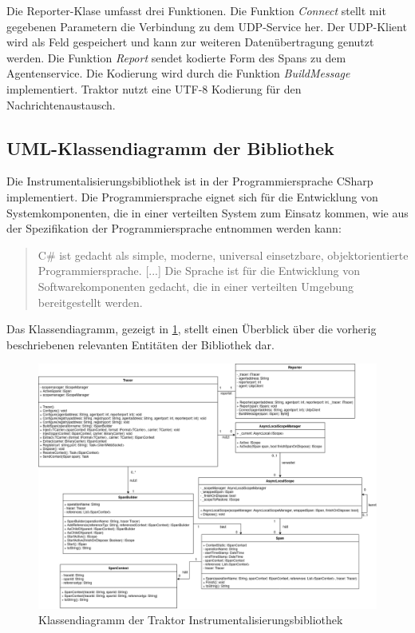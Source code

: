 Die Reporter-Klase umfasst drei Funktionen. Die Funktion \emph{Connect} stellt mit gegebenen Parametern die Verbindung zu dem UDP-Service her. Der UDP-Klient wird als Feld gespeichert und kann zur weiteren Datenübertragung genutzt werden. Die Funktion \emph{Report} sendet kodierte Form des Spans zu dem Agentenservice. Die Kodierung wird durch die Funktion \emph{BuildMessage} implementiert. Traktor nutzt eine UTF-8 Kodierung für den Nachrichtenaustausch.

\subsection{UML-Klassendiagramm der Bibliothek}
\label{subsection:UML-Klassendiagramm der Bibliothek}

Die Instrumentalisierungsbibliothek ist in der Programmiersprache CSharp implementiert. Die Programmiersprache eignet sich für die Entwicklung von Systemkomponenten, die in einer verteilten System zum Einsatz kommen, wie aus der Spezifikation der Programmiersprache entnommen werden kann: 

\begin{quote}
	C\# ist gedacht als simple, moderne,  universal einsetzbare, objektorientierte Programmiersprache. [...] Die Sprache ist für die Entwicklung von Softwarekomponenten gedacht, die in einer verteilten Umgebung bereitgestellt werden.
\end{quote}

Das Klassendiagramm, gezeigt in \cref{fig:TraktorKlassendiagramm}, stellt einen Überblick über die vorherig beschriebenen relevanten Entitäten der Bibliothek dar.

\newpage
\begin{landscape}
	\begin{figure}
		\centering
		\includegraphics[scale=0.4]{img/Implementierung/TraktorKlassendiagramm.png}
		\caption[Klassendiagramm der Traktor Instrumentalisierungsbibliothek]{Klassendiagramm der Traktor Instrumentalisierungsbibliothek}
		\label{fig:TraktorKlassendiagramm}
	\end{figure}
\end{landscape}

